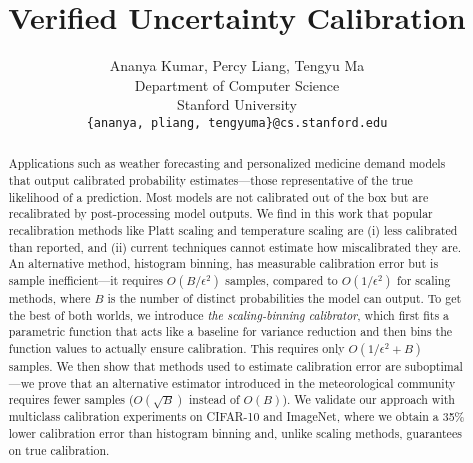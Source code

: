 \documentclass{article}
\title{Verified Uncertainty Calibration}
\author{%
  Ananya Kumar, Percy Liang, Tengyu Ma \\
  Department of Computer Science\\
  Stanford University\\
  \texttt{\{ananya, pliang, tengyuma\}@cs.stanford.edu} \\
}
\newcommand{\ourcal}[0]{the scaling-binning calibrator}
\begin{document}
\maketitle

\begin{abstract}
  Applications such as weather forecasting and personalized medicine demand models that output calibrated probability estimates---those representative of the true likelihood of a prediction. Most models are not calibrated out of the box but are recalibrated by post-processing model outputs. We find in this work that popular recalibration methods like Platt scaling and temperature scaling are (i) less calibrated than reported, and (ii) current techniques cannot estimate how miscalibrated they are. An alternative method, histogram binning, has measurable calibration error but is sample inefficient---it requires $O(B/\epsilon^2)$ samples, compared to $O(1/\epsilon^2)$ for scaling methods, where $B$ is the number of distinct probabilities the model can output. To get the best of both worlds, we introduce \emph{\ourcal{}}, which first fits a parametric function that acts like a baseline for variance reduction and then bins the function values to actually ensure calibration. This requires only $O(1/\epsilon^2 + B)$ samples. We then show that methods used to estimate calibration error are suboptimal---we prove that an alternative estimator introduced in the meteorological community requires fewer samples ($O(\sqrt{B})$ instead of $O(B)$). We validate our approach with multiclass calibration experiments on CIFAR-10 and ImageNet, where we obtain a 35\% lower calibration error than histogram binning and, unlike scaling methods, guarantees on true calibration.


\end{abstract}
\end{document}
